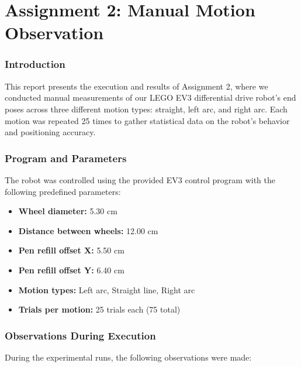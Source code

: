 
\clearpage
\part{Assignment 2: Manual Motion Observation}
\setcounter{section}{0}

\section{Introduction}
This report presents the execution and results of Assignment 2, where we conducted manual measurements of our LEGO EV3 differential drive robot's end poses across three different motion types: straight, left arc, and right arc. Each motion was repeated 25 times to gather statistical data on the robot's behavior and positioning accuracy.

\section{Program and Parameters}

The robot was controlled using the provided EV3 control program with the following predefined parameters:
\begin{itemize}
    \item \textbf{Wheel diameter:} 5.30 cm
    \item \textbf{Distance between wheels:} 12.00 cm
    \item \textbf{Pen refill offset X:} 5.50 cm
    \item \textbf{Pen refill offset Y:} 6.40 cm
    \item \textbf{Motion types:} Left arc, Straight line, Right arc
    \item \textbf{Trials per motion:} 25 trials each (75 total)
\end{itemize}



\section{Observations During Execution}

During the experimental runs, the following observations were made:

